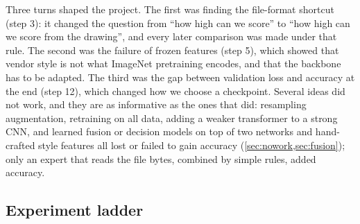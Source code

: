 Three turns shaped the project. The first was finding the file-format shortcut (step 3): it changed the question from ``how high can we score'' to ``how high can we score from the drawing'', and every later comparison was made under that rule. The second was the failure of frozen features (step 5), which showed that vendor style is not what ImageNet pretraining encodes, and that the backbone has to be adapted. The third was the gap between validation loss and accuracy at the end (step 12), which changed how we choose a checkpoint. Several ideas did not work, and they are as informative as the ones that did: resampling augmentation, retraining on all data, adding a weaker transformer to a strong CNN, and learned fusion or decision models on top of two networks and hand-crafted style features all lost or failed to gain accuracy (\cref{sec:nowork,sec:fusion}); only an expert that reads the file bytes, combined by simple rules, added accuracy.

\subsection{Experiment ladder}
\label{sec:ladder}
